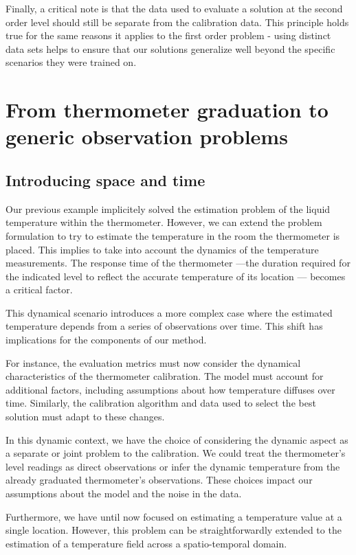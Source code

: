 \begin{bibunit}
Finally, a critical note is that the data used to evaluate a solution at the second order level should still be separate from the calibration data. This principle holds true for the same reasons it applies to the first order problem - using distinct data sets helps to ensure that our solutions generalize well beyond the specific scenarios they were trained on.

\section{From thermometer graduation to generic observation problems}
\subsection{Introducing space and time}
Our previous example implicitely solved the estimation problem of the liquid temperature  within the thermometer. However, we can extend the problem formulation to try to estimate the temperature in the room the thermometer is placed. This implies to take into account the dynamics of the temperature measurements. The response time of the thermometer —the duration required for the indicated level to reflect the accurate temperature of its location — becomes a critical factor.

This dynamical scenario introduces a more complex case where the estimated temperature depends from a series of observations over time. This shift has implications for the components of our method.

For instance, the evaluation metrics must now consider the dynamical characteristics of the thermometer calibration. The model must account for additional factors, including assumptions about how temperature diffuses over time. Similarly, the calibration algorithm and data used to select the best solution must adapt to these changes.

In this dynamic context, we have the choice of considering the dynamic aspect as a separate or joint problem to the calibration. We could treat the thermometer's level readings as direct observations or infer the dynamic temperature from the already graduated thermometer's observations. These choices impact our assumptions about the model and the noise in the data.

Furthermore, we have until now focused on estimating a temperature value at a single location. However, this problem can be straightforwardly extended to the estimation of a temperature field across a spatio-temporal domain.


\end{bibunit}
